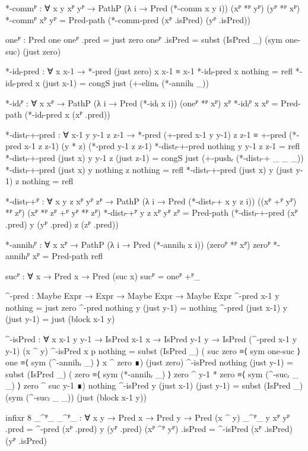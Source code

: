 \begin{code}[hide]
  *-commᴾ :
    ∀ {x y} xᴾ yᴾ → PathP (λ i → Pred (*-comm x y i)) (xᴾ *ᴾ yᴾ) (yᴾ *ᴾ xᴾ)
  *-commᴾ xᴾ yᴾ = Pred-path (*-comm-pred (xᴾ .isPred) (yᴾ .isPred))

  oneᴾ : Pred one
  oneᴾ .pred = just zero
  oneᴾ .isPred = subst (IsPred _) (sym one-suc) (just zero)

  *-idₗ-pred : ∀ x x-1 → *-pred (just zero) x x-1 ≡ x-1
  *-idₗ-pred x nothing = refl
  *-idₗ-pred x (just x-1) = congS just (+-elimᵣ (*-annihₗ _))

  *-idₗᴾ : ∀ {x} xᴾ → PathP (λ i → Pred (*-idₗ x i)) (oneᴾ *ᴾ xᴾ) xᴾ
  *-idₗᴾ {x} xᴾ = Pred-path (*-idₗ-pred x (xᴾ .pred))

  *-distₗ-+-pred :
    ∀ x-1 y y-1 z z-1 →
    *-pred (+-pred x-1 y y-1) z z-1 ≡
    +-pred (*-pred x-1 z z-1) (y * z) (*-pred y-1 z z-1)
  *-distₗ-+-pred nothing y y-1 z z-1 = refl
  *-distₗ-+-pred (just x) y y-1 z (just z-1) =
    congS just (+-pushᵣ (*-distₗ-+ _ _ _))
  *-distₗ-+-pred (just x) y nothing z nothing = refl
  *-distₗ-+-pred (just x) y (just y-1) z nothing = refl

  *-distₗ-+ᴾ :
    ∀ {x y z} xᴾ yᴾ zᴾ →
    PathP (λ i → Pred (*-distₗ-+ x y z i))
      ((xᴾ +ᴾ yᴾ) *ᴾ zᴾ) (xᴾ *ᴾ zᴾ +ᴾ yᴾ *ᴾ zᴾ)
  *-distₗ-+ᴾ {y} {z} xᴾ yᴾ zᴾ =
    Pred-path (*-distₗ-+-pred (xᴾ .pred) y (yᴾ .pred) z (zᴾ .pred))

  *-annihₗᴾ : ∀ {x} xᴾ → PathP (λ i → Pred (*-annihₗ x i)) (zeroᴾ *ᴾ xᴾ) zeroᴾ
  *-annihₗᴾ xᴾ = Pred-path refl

  sucᴾ : ∀ {x} → Pred x → Pred (suc x)
  sucᴾ = oneᴾ +ᴾ_

  ^-pred : Maybe Expr → Expr → Maybe Expr → Maybe Expr
  ^-pred x-1 y nothing = just zero
  ^-pred nothing y (just y-1) = nothing
  ^-pred (just x-1) y (just y-1) = just (block x-1 y)

  ^-isPred :
    ∀ {x x-1 y y-1} →
    IsPred x-1 x → IsPred y-1 y → IsPred (^-pred x-1 y y-1) (x ^ y)
  ^-isPred {x} p nothing =
    subst (IsPred _)
      ( suc zero ≡⟨ sym one-suc ⟩
        one      ≡⟨ sym (^-annihᵣ _) ⟩
        x ^ zero ∎)
      (just zero)
  ^-isPred nothing (just y-1) =
    subst (IsPred _)
      ( zero              ≡⟨ sym (*-annihᵣ _) ⟩
        zero ^ y-1 * zero ≡⟨ sym (^-sucᵣ _ _) ⟩
        zero ^ suc y-1    ∎)
      nothing
  ^-isPred {y} (just x-1) (just y-1) =
    subst (IsPred _) (sym (^-sucₗ _ _)) (just (block x-1 y))

  infixr 8 _^ᴾ_
  _^ᴾ_ : ∀ {x y} → Pred x → Pred y → Pred (x ^ y)
  _^ᴾ_ {y} xᴾ yᴾ .pred = ^-pred (xᴾ .pred) y (yᴾ .pred)
  (xᴾ ^ᴾ yᴾ) .isPred = ^-isPred (xᴾ .isPred) (yᴾ .isPred)


\end{code}

